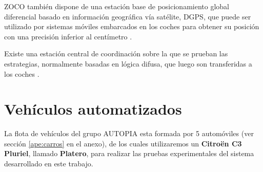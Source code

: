 \gls{ZOCO} también dispone de una estación base de posicionamiento global diferencial basado en información geográfica vía satélite, \gls{DGPS}, que puede ser utilizado por sistemas móviles embarcados en los coches para obtener su posición con una precisión inferior al centímetro \cite{Milanes2008a} \cite{Milanes2008b}. 

Existe una estación central de coordinación sobre la que se prueban las estrategias, normalmente basadas en lógica difusa, que luego son transferidas a los coches \cite{GodoyBilbao2010}.

\section{Vehículos automatizados}
\label{sec:carros}

La flota de vehículos del grupo AUTOPIA esta formada por 5 automóviles (ver sección \ref{ape:carros} en el anexo), de los cuales utilizaremos un \textbf{Citroën C3 Pluriel}, llamado \textbf{Platero}, para realizar las pruebas experimentales del sistema desarrollado en este trabajo.

